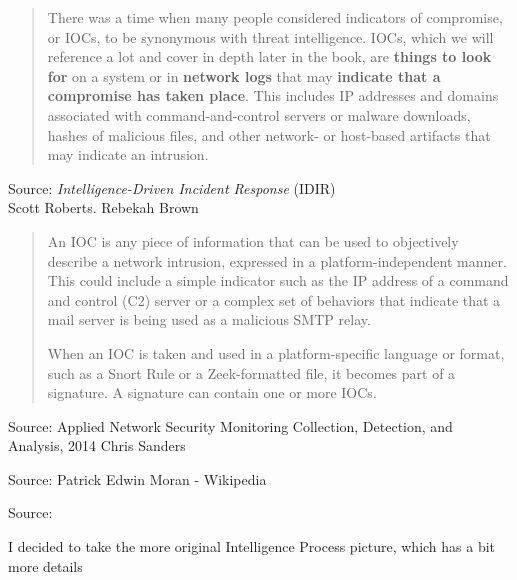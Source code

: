 \documentclass[Screen16to9,17pt]{foils}
\begin{document}
\begin{quote}
There was a time when many people considered indicators of compromise, or IOCs,
to be synonymous with threat intelligence. IOCs, which we will reference a lot and
cover in depth later in the book, are {\bf things to look for} on a system or in {\bf network logs} that may {\bf indicate that a compromise has taken place}. This includes IP addresses and domains associated with command-and-control servers or malware downloads, hashes of malicious files, and other network- or host-based artifacts that may indicate an intrusion.
\end{quote}
Source: \emph{Intelligence-Driven Incident Response} (IDIR)\\
 Scott Roberts. Rebekah Brown




\begin{quote}
An IOC is any piece of information that can be used to objectively describe a
network intrusion, expressed in a platform-independent manner. This could include a simple indicator such as the IP address of a command and control (C2) server or a complex set of behaviors that indicate that a mail server is being used as a malicious SMTP relay.

When an IOC is taken and used in a platform-specific language or format, such as a Snort Rule or a Zeek-formatted file, it becomes part of a signature. A signature can contain one or more IOCs.
\end{quote}

Source: Applied Network Security Monitoring Collection, Detection, and Analysis, 2014 Chris Sanders



Source: Patrick Edwin Moran - Wikipedia 




Source: 

\begin{list2}
\item I decided to take the more original Intelligence Process picture, which has a bit more details
\end{list2}
\end{document}
